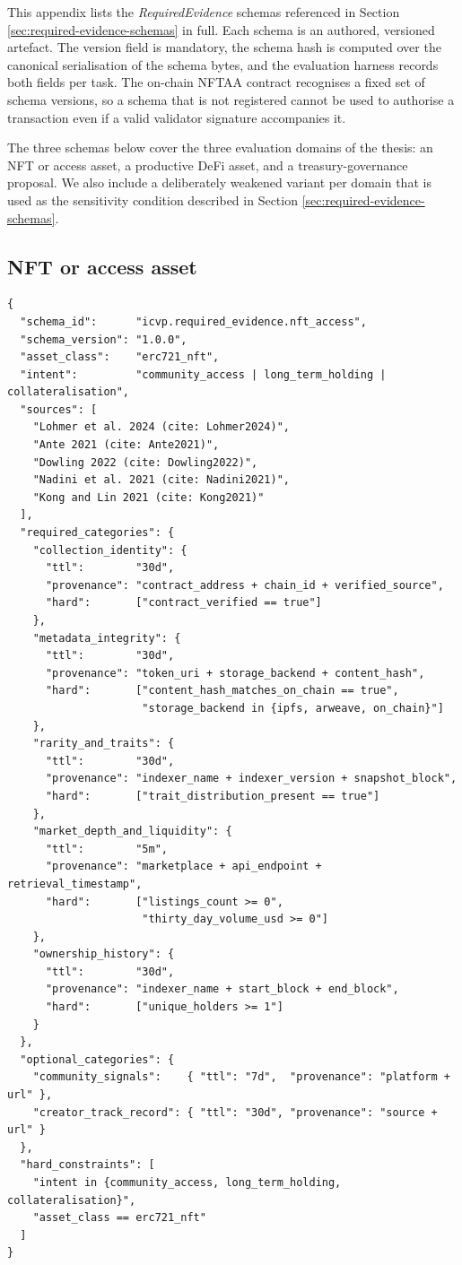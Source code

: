 \label{app:required-evidence-schemas}

This appendix lists the \textit{RequiredEvidence} schemas referenced in Section \ref{sec:required-evidence-schemas} in full. Each schema is an authored, versioned artefact. The version field is mandatory, the schema hash is computed over the canonical serialisation of the schema bytes, and the evaluation harness records both fields per task. The on-chain NFTAA contract recognises a fixed set of schema versions, so a schema that is not registered cannot be used to authorise a transaction even if a valid validator signature accompanies it.

The three schemas below cover the three evaluation domains of the thesis: an NFT or access asset, a productive DeFi asset, and a treasury-governance proposal. We also include a deliberately weakened variant per domain that is used as the sensitivity condition described in Section \ref{sec:required-evidence-schemas}.

\subsection{NFT or access asset}
\label{app:schema-nft}

\begin{verbatim}
{
  "schema_id":      "icvp.required_evidence.nft_access",
  "schema_version": "1.0.0",
  "asset_class":    "erc721_nft",
  "intent":         "community_access | long_term_holding | collateralisation",
  "sources": [
    "Lohmer et al. 2024 (cite: Lohmer2024)",
    "Ante 2021 (cite: Ante2021)",
    "Dowling 2022 (cite: Dowling2022)",
    "Nadini et al. 2021 (cite: Nadini2021)",
    "Kong and Lin 2021 (cite: Kong2021)"
  ],
  "required_categories": {
    "collection_identity": {
      "ttl":        "30d",
      "provenance": "contract_address + chain_id + verified_source",
      "hard":       ["contract_verified == true"]
    },
    "metadata_integrity": {
      "ttl":        "30d",
      "provenance": "token_uri + storage_backend + content_hash",
      "hard":       ["content_hash_matches_on_chain == true",
                     "storage_backend in {ipfs, arweave, on_chain}"]
    },
    "rarity_and_traits": {
      "ttl":        "30d",
      "provenance": "indexer_name + indexer_version + snapshot_block",
      "hard":       ["trait_distribution_present == true"]
    },
    "market_depth_and_liquidity": {
      "ttl":        "5m",
      "provenance": "marketplace + api_endpoint + retrieval_timestamp",
      "hard":       ["listings_count >= 0",
                     "thirty_day_volume_usd >= 0"]
    },
    "ownership_history": {
      "ttl":        "30d",
      "provenance": "indexer_name + start_block + end_block",
      "hard":       ["unique_holders >= 1"]
    }
  },
  "optional_categories": {
    "community_signals":    { "ttl": "7d",  "provenance": "platform + url" },
    "creator_track_record": { "ttl": "30d", "provenance": "source + url" }
  },
  "hard_constraints": [
    "intent in {community_access, long_term_holding, collateralisation}",
    "asset_class == erc721_nft"
  ]
}
\end{verbatim}

